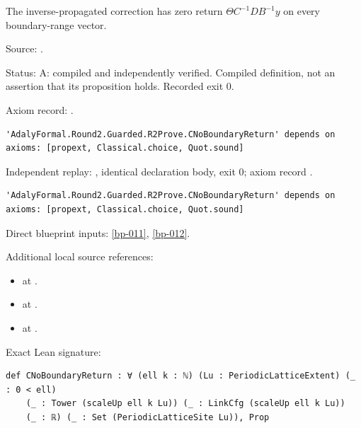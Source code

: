 \begin{definition}[bp-014]
\label{bp-014}
\leanok
The inverse-propagated correction has zero return \(\Theta C^{-1}DB^{-1}y\) on every boundary-range vector.

\par Source: \texttt{}.
\par Status: A: compiled and independently verified. Compiled definition, not an assertion that its proposition holds. Recorded exit 0.
\par Axiom record: \texttt{}.
\begin{verbatim}
'AdalyFormal.Round2.Guarded.R2Prove.CNoBoundaryReturn' depends on axioms: [propext, Classical.choice, Quot.sound]
\end{verbatim}
\par Independent replay: \texttt{}, identical declaration body, exit 0; axiom record \texttt{}.
\begin{verbatim}
'AdalyFormal.Round2.Guarded.R2Prove.CNoBoundaryReturn' depends on axioms: [propext, Classical.choice, Quot.sound]
\end{verbatim}
\par Direct blueprint inputs: \ref{bp-011}, \ref{bp-012}.
\par Additional local source references:
\begin{itemize}
\item \texttt{} at \texttt{}.
\item \texttt{} at \texttt{}.
\item \texttt{} at \texttt{}.
\end{itemize}
\par Exact Lean signature:
\begin{verbatim}
def CNoBoundaryReturn : ∀ (ell k : ℕ) (Lu : PeriodicLatticeExtent) (_ : 0 < ell)
    (_ : Tower (scaleUp ell k Lu)) (_ : LinkCfg (scaleUp ell k Lu))
    (_ : ℝ) (_ : Set (PeriodicLatticeSite Lu)), Prop
\end{verbatim}
\end{definition}

